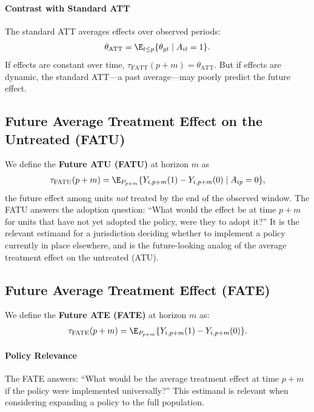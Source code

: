 \documentclass{article}
\begin{document}
\paragraph{Contrast with Standard ATT}


The standard ATT averages effects over observed periods:
\begin{align}
\theta_{\text{ATT}} = \E_{t \leq p}\{\theta_{gt} \mid A_{it} = 1\}.
\end{align}
If effects are constant over time, $\tau_{\text{FATT}}(p+m) = \theta_{\text{ATT}}$. But if effects are dynamic, the standard ATT---a past average---may poorly predict the future effect.

\subsection{Future Average Treatment Effect on the Untreated (FATU)}

We define the \textbf{Future ATU (FATU)} at horizon $m$ as
\begin{align}
\tau_{\text{FATU}}(p+m) = \E_{P_{p+m}}\{Y_{i,p+m}(1) - Y_{i,p+m}(0) \mid A_{ip} = 0\},
\label{eq:fatu}
\end{align}
the future effect among units \emph{not} treated by the end of the observed window. The FATU answers the adoption question: ``What would the effect be at time $p+m$ for units that have not yet adopted the policy, were they to adopt it?'' It is the relevant estimand for a jurisdiction deciding whether to implement a policy currently in place elsewhere, and is the future-looking analog of the average treatment effect on the untreated (ATU).

\subsection{Future Average Treatment Effect (FATE)}

We define the \textbf{Future ATE (FATE)} at horizon $m$ as:
\begin{align}
\tau_{\text{FATE}}(p+m) = \E_{P_{p+m}}\{Y_{i,p+m}(1) - Y_{i,p+m}(0)\}.
\label{eq:fate}
\end{align}

\paragraph{Policy Relevance}

The FATE answers: ``What would be the average treatment effect at time $p+m$ if the policy were implemented universally?'' This estimand is relevant when considering expanding a policy to the full population.
\end{document}
